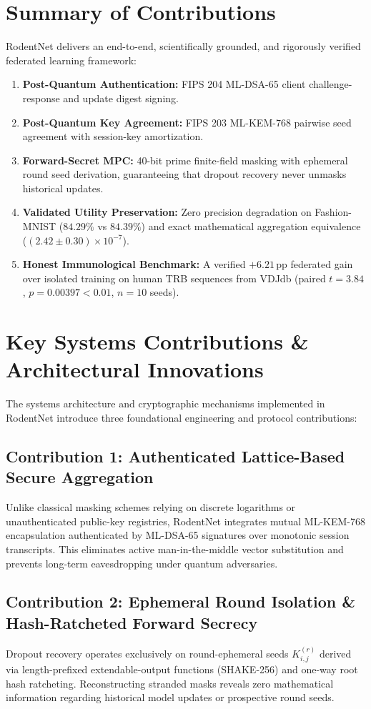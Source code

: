 \documentclass[11pt,a4paper]{report}
\begin{document}
\section{Summary of Contributions}
RodentNet delivers an end-to-end, scientifically grounded, and rigorously verified federated learning framework:
\begin{enumerate}[itemsep=2pt]
  \item \textbf{Post-Quantum Authentication:} FIPS 204 ML-DSA-65 client challenge-response and update digest signing.
  \item \textbf{Post-Quantum Key Agreement:} FIPS 203 ML-KEM-768 pairwise seed agreement with session-key amortization.
  \item \textbf{Forward-Secret MPC:} 40-bit prime finite-field masking with ephemeral round seed derivation, guaranteeing that dropout recovery never unmasks historical updates.
  \item \textbf{Validated Utility Preservation:} Zero precision degradation on Fashion-MNIST ($84.29\%$ vs $84.39\%$) and exact mathematical aggregation equivalence ($(2.42 \pm 0.30) \times 10^{-7}$).
  \item \textbf{Honest Immunological Benchmark:} A verified $+6.21$\,pp federated gain over isolated training on human TRB sequences from VDJdb (paired $t = 3.84$, $p = 0.00397 < 0.01$, $n = 10$ seeds).
\end{enumerate}

\section{Key Systems Contributions \& Architectural Innovations}
The systems architecture and cryptographic mechanisms implemented in RodentNet introduce three foundational engineering and protocol contributions:

\subsection*{Contribution 1: Authenticated Lattice-Based Secure Aggregation}
Unlike classical masking schemes relying on discrete logarithms or unauthenticated public-key registries, RodentNet integrates mutual ML-KEM-768 encapsulation authenticated by ML-DSA-65 signatures over monotonic session transcripts. This eliminates active man-in-the-middle vector substitution and prevents long-term eavesdropping under quantum adversaries.

\subsection*{Contribution 2: Ephemeral Round Isolation \& Hash-Ratcheted Forward Secrecy}
Dropout recovery operates exclusively on round-ephemeral seeds $K_{i,j}^{(r)}$ derived via length-prefixed extendable-output functions (SHAKE-256) and one-way root hash ratcheting. Reconstructing stranded masks reveals zero mathematical information regarding historical model updates or prospective round seeds.
\end{document}

